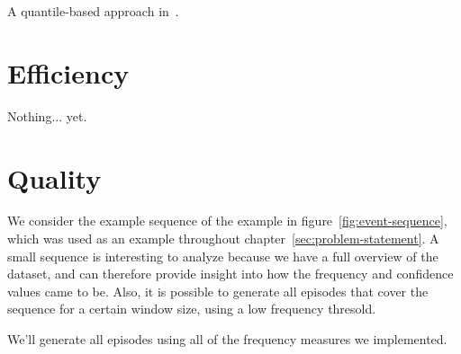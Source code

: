 A quantile-based approach in~\citep{feremans2018mining}.

\section{Efficiency}

Nothing... yet.

\section{Quality}

We consider the example sequence of the example in figure~\ref{fig:event-sequence}, which was used as an example throughout chapter~\ref{sec:problem-statement}. A small sequence is interesting to analyze because we have a full overview of the dataset, and can therefore provide insight into how the frequency and confidence values came to be. Also, it is possible to generate all episodes that cover the sequence for a certain window size, using a low frequency thresold.

We'll generate all episodes using all of the frequency measures we implemented.

\begin{table}

\begin{tabulary}{\textwidth}{ L|R|R|R }



\end{tabulary}

\end{table}
